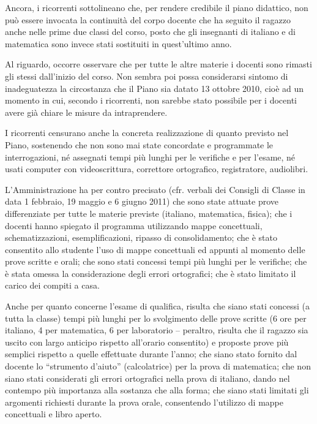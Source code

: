 \begin{enumerate}
	Ancora, i ricorrenti sottolineano che, per rendere credibile il piano didattico, non può essere invocata la continuità del corpo docente che ha seguito il ragazzo anche nelle prime due classi del corso, posto che gli insegnanti di italiano e di matematica sono invece stati sostituiti in quest'ultimo anno.
	
	Al riguardo, occorre osservare che per tutte le altre materie i docenti sono rimasti gli stessi dall'inizio del corso.
	Non sembra poi possa considerarsi sintomo di inadeguatezza la circostanza che il Piano sia datato 13 ottobre 2010, cioè ad un momento in cui, secondo i ricorrenti, non sarebbe stato possibile per i docenti avere già chiare le misure da intraprendere.
	
	I ricorrenti censurano anche la concreta realizzazione di quanto previsto nel Piano, sostenendo che non sono mai state concordate e programmate le interrogazioni, né assegnati tempi più lunghi per le verifiche e per l'esame, né usati computer con videoscrittura, correttore ortografico, registratore, audiolibri.
	
	L'Amministrazione ha per contro precisato (cfr. verbali dei Consigli di Classe in data 1 febbraio, 19 maggio e 6 giugno 2011) che sono state attuate prove differenziate per tutte le materie previste (italiano, matematica, fisica); che i docenti hanno spiegato il programma utilizzando mappe concettuali, schematizzazioni, esemplificazioni, ripasso di consolidamento; che è stato consentito allo studente l'uso di mappe concettuali ed appunti al momento delle prove scritte e orali; che sono stati concessi tempi più lunghi per le verifiche; che è stata omessa la considerazione degli errori ortografici; che è stato limitato il carico dei compiti a casa.
	
	Anche per quanto concerne l'esame di qualifica, risulta che siano stati concessi (a tutta la classe) tempi più lunghi per lo svolgimento delle prove scritte (6 ore per italiano, 4 per matematica, 6 per laboratorio – peraltro, risulta che il ragazzo sia uscito con largo anticipo rispetto all'orario consentito) e proposte prove più semplici rispetto a quelle effettuate durante l'anno; che siano stato fornito dal docente lo “strumento d'aiuto” (calcolatrice) per la prova di matematica; che non siano stati considerati gli errori ortografici nella prova di italiano, dando nel contempo più importanza alla sostanza che alla forma; che siano stati limitati gli argomenti richiesti durante la prova orale, consentendo l'utilizzo di mappe concettuali e libro aperto.
	

\end{enumerate}
